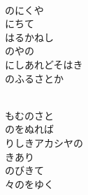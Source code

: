 \documentclass[10pt,b5j]{tarticle} %
\begin{document}
\vspace{1.5em} %
\newcommand{\linespace}{0.5em} %
\newcommand{\blocksize}{0.5\hsize} %
\newcommand{\itemmargin}{3em} %
\begin{enumerate} %
    \setlength{\itemindent}{\itemmargin} %
    \begin{minipage}[c]{\blocksize}
    
        \vspace{\linespace}
        \item~\\
        のにくや\\
        にちて\\
        はるかねし\\
        のやの\\
        にしあれどそはき\\
        のふるさとか
        
    \end{minipage}
    \begin{minipage}[c]{\blocksize}
        
        \vspace{\linespace}
        \item~\\
        もむのさと\\
        のをぬれば\\
        りしきアカシヤの\\
        きあり\\
        のびきて\\
        々のをゆく
        
    \end{minipage}
    \begin{minipage}[c]{\blocksize}
        

\end{minipage}
\end{enumerate}
\end{document}
